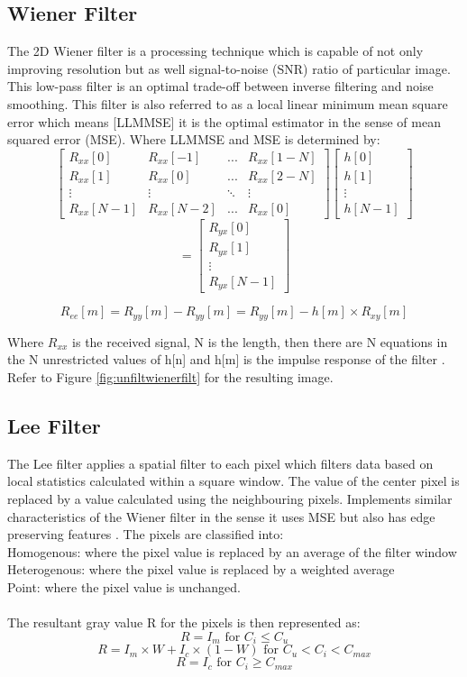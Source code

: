 \documentclass[%
reprint,
showpacs,preprintnumbers,
bibnotes,
amsmath,amssymb,
aps,
pra,
]{revtex4-1}
\begin{document}
	\subsection{\label{sec:level2} Wiener Filter}
	The 2D Wiener filter is a processing technique which is capable of not only improving resolution but as well signal-to-noise (SNR) ratio of particular image. This low-pass filter is an optimal trade-off between inverse filtering and noise smoothing. This filter is also referred to as a local linear minimum mean square error which means [LLMMSE] it is the optimal estimator in the sense of mean squared error (MSE). Where LLMMSE and MSE is determined by:
$$
\begin{bmatrix}
R_{xx}[0] & R_{xx}[-1] & ... & R_{xx}[1-N]\\
R_{xx}[1] & R_{xx}[0] & ... & R_{xx}[2-N]\\
\vdots & \vdots & \ddots & \vdots \\
R_{xx}[N-1] & R_{xx}[N-2] & ... & R_{xx}[0]
\end{bmatrix}
\begin{bmatrix}
h[0]\\
h[1]\\
\vdots\\
h[N-1]
\end{bmatrix}
$$
$$
=
\begin{bmatrix}
R_{yx}[0]\\
R_{yx}[1]\\
\vdots\\
R_{yx}[N-1]
\end{bmatrix}
$$

$$R_{ee}[m]=R_{yy}[m]-R_{yy}[m] = R_{yy}[m]-h[m] \times R_{xy}[m]$$

Where $R_{xx}$ is the received signal, N is the length, then there are N equations in the N unrestricted values of h[n] and h[m] is the impulse response of the filter \cite{Oppenheim_2015}. Refer to Figure \ref{fig:unfiltwienerfilt} for the resulting image.


\subsection{\label{sec:level2} Lee Filter}
The Lee filter applies a spatial filter to each pixel which filters data based on local statistics calculated within a square window. The value of the center pixel is replaced by a value calculated using the neighbouring pixels. Implements similar characteristics of the Wiener filter in the sense it uses MSE but also has edge preserving features \cite{leefilter}. The pixels are classified into:
\\
Homogenous: where the pixel value is replaced by an average of the filter window
\\
Heterogenous: where the pixel value is replaced by a weighted average
\\
Point: where the pixel value is unchanged.
\\
\\
The resultant gray value R for the pixels is then represented as:
$$R = I_{m} \text{ for } C_{i} \leq C_{u}$$
$$R = I_{m} \times W+I_{c} \times (1-W) \text{ for } C_{u}<C_{i}<C_{max}$$
$$R = I_{c} \text{ for } C_{i} \geq C_{max}$$
\end{document}
